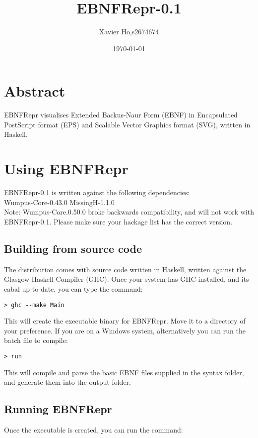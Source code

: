 \documentclass[a4paper]{article}
\title{EBNFRepr-0.1}
\author{Xavier Ho,\quad s2674674}
\date{\today}
\begin{document}
\maketitle

\section*{\centering \small Abstract}
EBNFRepr visualises Extended Backus-Naur Form (EBNF) in Encapsulated PostScript format (EPS)
and Scalable Vector Graphics format (SVG), written in Haskell.

\section{Using EBNFRepr}
EBNFRepr-0.1 is written against the following dependencies:
\\

\quad Wumpus-Core-0.43.0 \qquad MissingH-1.1.0
\\

Note: Wumpus-Core.0.50.0 broke backwards compatibility, and will not work with EBNFRepr-0.1.
Please make sure your hackage list has the correct version.

\subsection{Building from source code}
The distribution comes with source code written in Haskell, written against the Glasgow Haskell Compiler
(GHC). Once your system has GHC installed, and its cabal up-to-date, you can type the command:

\begin{verbatim}
> ghc --make Main
\end{verbatim}

This will create the executable binary for EBNFRepr. Move it to a directory of your preference. If you are 
on a Windows system, alternatively you can run the batch file to compile:

\begin{verbatim}
> run
\end{verbatim}

This will compile and parse the basic EBNF files supplied in the syntax folder, and generate them into the output folder.

\subsection{Running EBNFRepr}
Once the executable is created, you can run the command:
\end{document}
